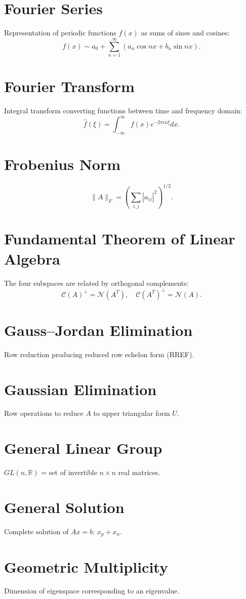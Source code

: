 \documentclass[12pt]{book}
\begin{document}
\chapter{Fourier Series}
Representation of periodic functions $f(x)$ as sums of sines and cosines:
\[
f(x) \sim a_0 + \sum_{n=1}^\infty (a_n \cos nx + b_n \sin nx).
\]

\chapter{Fourier Transform}
Integral transform converting functions between time and frequency domain:
\[
\hat f(\xi) = \int_{-\infty}^\infty f(x) e^{-2\pi i x \xi} dx.
\]

\chapter{Frobenius Norm}
\[
\|A\|_F = \left( \sum_{i,j} |a_{ij}|^2 \right)^{1/2}.
\]

\chapter{Fundamental Theorem of Linear Algebra}
The four subspaces are related by orthogonal complements:
\[
\mathcal{C}(A)^\perp = \mathcal{N}(A^T), \quad \mathcal{C}(A^T)^\perp = \mathcal{N}(A).
\]

\chapter{Gauss--Jordan Elimination}
Row reduction producing reduced row echelon form (RREF).

\chapter{Gaussian Elimination}
Row operations to reduce $A$ to upper triangular form $U$.

\chapter{General Linear Group}
$GL(n,\mathbb{R})$ = set of invertible $n \times n$ real matrices.

\chapter{General Solution}
Complete solution of $Ax=b$: $x_p + x_n$.

\chapter{Geometric Multiplicity}
Dimension of eigenspace corresponding to an eigenvalue.
\end{document}
